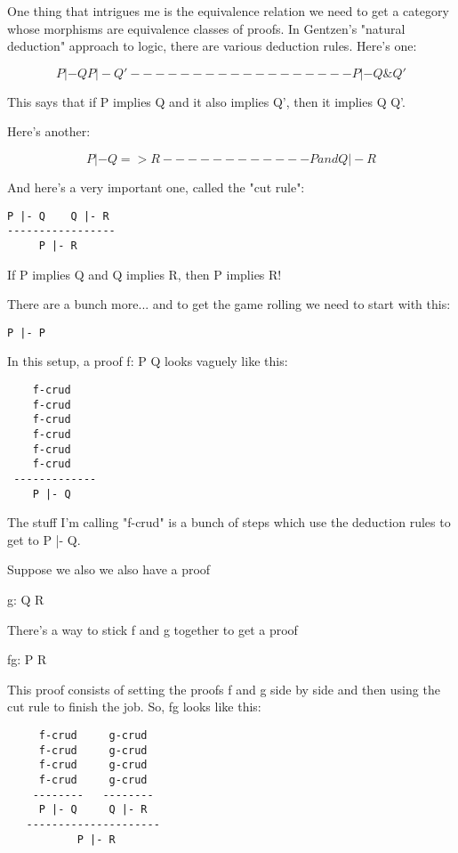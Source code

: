 One thing that intrigues me is the equivalence relation we need to get 
a category whose morphisms are equivalence classes of proofs.  In 
Gentzen's "natural deduction" approach to logic, there are various 
deduction rules.  Here's one: 

$$
P |- Q    P |- Q'
------------------
  P |- Q \text{\&}  Q'
$$
    

This says that if P implies Q and it also implies Q', then it 
implies Q \text{\&}  Q'.   

Here's another:

$$
P |- Q => R
------------
P and Q |- R
$$
    
And here's a very important one, called the "cut rule":

\begin{verbatim}
P |- Q    Q |- R
-----------------
     P |- R
\end{verbatim}
    
If P implies Q and Q implies R, then P implies R!

There are a bunch more... and to get the game rolling we need
to start with this:

\begin{verbatim}
P |- P
\end{verbatim}
    
In this setup, a proof f: P \to  Q looks vaguely like this:

\begin{verbatim}
    f-crud
    f-crud
    f-crud
    f-crud
    f-crud
    f-crud
 -------------
    P |- Q 
\end{verbatim}
    
The stuff I'm calling "f-crud" is a bunch of steps which use the
deduction rules to get to P |- Q.  

Suppose we also we also have a proof

g: Q \to  R

There's a way to stick f and g together to get a proof

fg: P \to  R

This proof consists of setting the proofs f and g side by side and then
using the cut rule to finish the job.  So, fg looks like this:

\begin{verbatim}
     f-crud     g-crud
     f-crud     g-crud
     f-crud     g-crud
     f-crud     g-crud
    --------   --------
     P |- Q     Q |- R
   ---------------------
           P |- R 
\end{verbatim}
    
